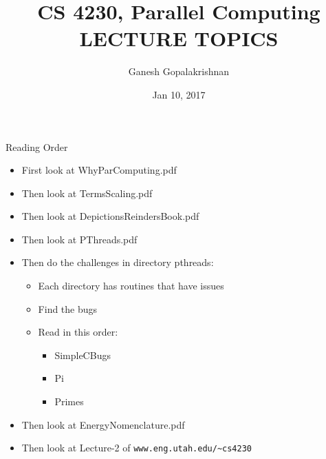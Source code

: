 \documentclass{beamer}
\title[]{CS 4230, Parallel Computing\\
   LECTURE TOPICS}
\author{Ganesh Gopalakrishnan}
\institute{School of Computing, Univ of Utah}
\date{Jan 10, 2017}
\begin{document}
\begin{frame}
  \titlepage
\end{frame}




\begin{frame}[fragile]{Reading Order}

\begin{itemize}
\item First look at WhyParComputing.pdf
\item Then look at TermsScaling.pdf
\item Then look at DepictionsReindersBook.pdf
\item Then look at PThreads.pdf
\item Then do the challenges in directory pthreads:
  \begin{itemize}
  \item Each directory has routines that have issues
  \item Find the bugs
  \item Read in this order: 
    \begin{itemize}
    \item SimpleCBugs
    \item Pi
    \item Primes
    \end{itemize}
  \end{itemize}
\item Then look at EnergyNomenclature.pdf
\item Then look at Lecture-2 of \verb|www.eng.utah.edu/~cs4230|
\end{itemize}
 
\end{frame}
\end{document}
